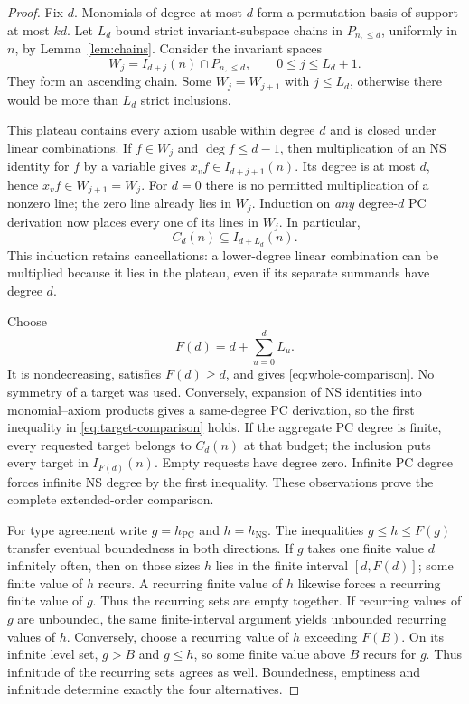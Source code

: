 \documentclass[11pt,a4paper]{article}
\theoremstyle{definition}\newtheorem{definition}[theorem]{Definition}
\theoremstyle{remark}\newtheorem{remark}[theorem]{Remark}
\newcommand{\NS}{\mathrm{NS}}\newcommand{\PC}{\mathrm{PC}}
\begin{document}
\begin{proof}
Fix $d$. Monomials of degree at most $d$ form a permutation basis of
support at most $kd$. Let $L_d$ bound strict invariant-subspace chains in
$P_{n,\le d}$, uniformly in $n$, by Lemma~\ref{lem:chains}.
Consider the invariant spaces
\[
              W_j=I_{d+j}(n)\cap P_{n,\le d},
                    \qquad 0\le j\le L_d+1.
\]
They form an ascending chain. Some $W_j=W_{j+1}$ with $j\le L_d$,
otherwise there would be more than $L_d$ strict inclusions.

This plateau contains every axiom usable within degree $d$ and is closed
under linear combinations. If $f\in W_j$ and $\deg f\le d-1$, then
multiplication of an NS identity for $f$ by a variable gives
$x_vf\in I_{d+j+1}(n)$. Its degree is at most $d$, hence
$x_vf\in W_{j+1}=W_j$. For $d=0$ there is no permitted multiplication
of a nonzero line; the zero line already lies in $W_j$.
Induction on \emph{any} degree-$d$ PC derivation now places every one of
its lines in $W_j$. In particular,
\[
                          C_d(n)\subseteq I_{d+L_d}(n).
\]
This induction retains cancellations: a lower-degree linear combination
can be multiplied because it lies in the plateau, even if its separate
summands have degree $d$.

Choose
\[
                          F(d)=d+\sum_{u=0}^d L_u.
\]
It is nondecreasing, satisfies $F(d)\ge d$, and gives
\eqref{eq:whole-comparison}. No symmetry of a target was used.
Conversely, expansion of NS identities into monomial--axiom products
gives a same-degree PC derivation, so the first inequality in
\eqref{eq:target-comparison} holds. If the aggregate PC degree is finite,
every requested target belongs to $C_d(n)$ at that budget; the inclusion
puts every target in $I_{F(d)}(n)$. Empty requests have degree zero.
Infinite PC degree forces infinite NS degree by the first inequality.
These observations prove the complete extended-order comparison.

For type agreement write $g=h_{\PC}$ and $h=h_{\NS}$.
The inequalities $g\le h\le F(g)$ transfer eventual boundedness in both
directions. If $g$ takes one finite value $d$ infinitely often, then on
those sizes $h$ lies in the finite interval $[d,F(d)]$; some finite value
of $h$ recurs. A recurring finite value of $h$ likewise forces a recurring
finite value of $g$. Thus the recurring sets are empty together.
If recurring values of $g$ are unbounded, the same finite-interval
argument yields unbounded recurring values of $h$. Conversely, choose a
recurring value of $h$ exceeding $F(B)$. On its infinite level set,
$g>B$ and $g\le h$, so some finite value above $B$ recurs for $g$.
Thus infinitude of the recurring sets agrees as well. Boundedness,
emptiness and infinitude determine exactly the four alternatives.
\end{proof}
\end{document}
